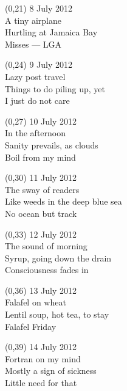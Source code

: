 \documentclass[10pt]{article}
\begin{document}
\begin{textblock}{10}(0,21)
8 July 2012 \\
A tiny airplane \\
Hurtling at Jamaica Bay \\
Misses  --- LGA
\end{textblock}

\begin{textblock}{10}(0,24)
9 July 2012 \\
Lazy post travel \\
Things to do piling up, yet \\
I just do not care
\end{textblock}

\begin{textblock}{10}(0,27)
10 July 2012 \\
In the afternoon \\
Sanity prevails, as clouds \\
Boil from my mind
\end{textblock}

\begin{textblock}{10}(0,30)
11 July 2012 \\
The sway of readers \\
Like weeds in the deep blue sea \\
No ocean but track
\end{textblock}

\begin{textblock}{10}(0,33)
12 July 2012 \\
The sound of morning \\
Syrup, going down the drain \\
Consciousness fades in
\end{textblock}

\begin{textblock}{10}(0,36)
13 July 2012 \\
Falafel on wheat \\
Lentil soup, hot tea, to stay \\
Falafel Friday
\end{textblock}

\begin{textblock}{10}(0,39)
14 July 2012 \\
Fortran on my mind \\
Mostly a sign of sickness \\
Little need for that
\end{textblock}
\end{document}
